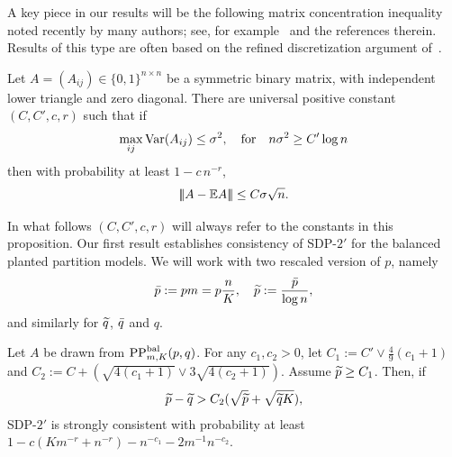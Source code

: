 \medskip
 A key piece in our results will be the following matrix concentration inequality noted recently by many authors; see, for example~\cite{Lei&Rinaldo2013,Chen2014,Tomozei2011} and the references therein. Results of this type are often based on the refined discretization argument of~\cite{Feige2005}.
\begin{prop}\label{prop:key:adj:concent}
Let $A = (A_{ij}) \in \{0,1\}^{n \times n}$ be a symmetric binary matrix, with independent lower triangle and zero diagonal. There are universal positive constant $(C,C',c,r)$ such that 
if 
\begin{align*}
  \max_{ij}\operatorname{Var}(A_{ij}) \le \sigma^2, \quad\text{for}\quad
  n \sigma^2 \ge C' \log n
\end{align*}
 then with probability at least $1 - c\, n^{-r}$,
\begin{align*}
  |\!|\!| A - \mathbb{E} A |\!|\!| \le C \sigma \sqrt{n}.
\end{align*}
\end{prop}
In what follows $(C,C',c,r)$ will always refer to the constants in this proposition.
Our first result establishes consistency of SDP-$2'$ for the balanced planted partition models. We will work with two rescaled version of $p$, namely %
\begin{align}\label{eq:p:defs}
\bar{p} := p m= p \frac{n}{K},  \quad   \widetilde{p} := \frac{\bar{p}}{\log n} , 
\end{align}
and similarly for $\widetilde{q}$, $\bar{q}$ and $q$.


\begin{thm}\label{thm:consist:SDP2}
  Let  $A$ be drawn from $\text{PP}^{\text{bal}}_{m,K}(p,q)$.
  For any $c_1,c_2 > 0$, let $C_1 := C' \vee \frac{4}{9}(c_1+1)$ and $C_2 := C + (\sqrt{4(c_1+1)} \vee 3 \sqrt{4 (c_2+1)})$. Assume $\widetilde{p} \ge C_1 $. Then, if 
  \begin{align}\label{eq:SDP2:consist:cond}
  \widetilde{p} - \widetilde{q} > C_2 ( \sqrt{\widetilde{p}} + \sqrt{  \widetilde{q} K}),
  \end{align}
  SDP-$2'$ is strongly consistent with probability at least $1 - c(Km^{-r} + n^{-r}) -n^{-c_1} - 2m^{-1}n^{-c_2}$.
\end{thm}


